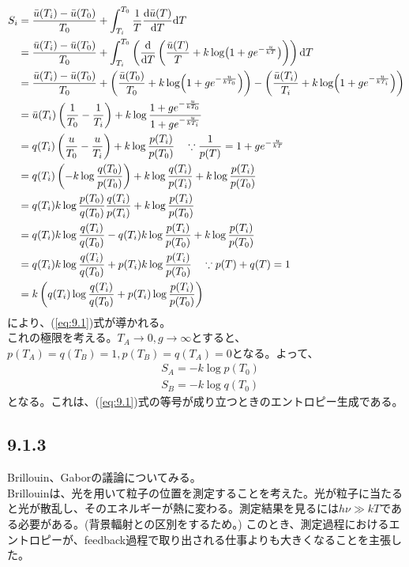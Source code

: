 \documentclass[a4paper,11pt]{jsarticle}
\numberwithin{equation}{section}
\begin{document}
\begin{align}
    S_i &= \frac{\bar{u}(T_i)-\bar{u}(T_0)}{T_0} + \int_{T_i}^{T_0}\frac{1}{T}\frac{\dd \bar{u}(T)}{\dd T}\dd T \\
    &= \frac{\bar{u}(T_i)-\bar{u}(T_0)}{T_0} + \int_{T_i}^{T_0}\left(\dv{T} \left(\frac{\bar{u}(T)}{T} +k\log(1+ge^{-\frac{u}{kT}})\right)\right)\dd T \\
    &= \frac{\bar{u}(T_i)-\bar{u}(T_0)}{T_0} + \left(\frac{\bar{u}(T_0)}{T_0} +k\log(1+ge^{-\frac{u}{kT_0}})\right) - \left(\frac{\bar{u}(T_i)}{T_i} +k\log(1+ge^{-\frac{u}{kT_i}})\right) \\
    &= \bar{u}(T_i)\left(\frac{1}{T_0} - \frac{1}{T_i}\right) + k\log\frac{1+ge^{-\frac{u}{kT_0}}}{1+ge^{-\frac{u}{kT_i}}} \\
    &= q(T_i)\left(\frac{u}{T_0} - \frac{u}{T_i}\right) + k\log\frac{p(T_i)}{p(T_0)} \quad \because \frac{1}{p(T)} = 1+ge^{-\frac{u}{kT}}\\
    &= q(T_i)\left(-k\log\frac{q(T_0)}{p(T_0)}\right) + k\log\frac{q(T_i)}{p(T_i)} + k\log\frac{p(T_i)}{p(T_0)} \\
    &= q(T_i)k\log\frac{p(T_0)}{q(T_0)}\frac{q(T_i)}{p(T_i)} + k\log\frac{p(T_i)}{p(T_0)} \\
    &= q(T_i)k\log\frac{q(T_i)}{q(T_0)} - q(T_i)k\log\frac{p(T_i)}{p(T_0)} + k\log\frac{p(T_i)}{p(T_0)} \\
    &= q(T_i)k\log\frac{q(T_i)}{q(T_0)} + p(T_i)k\log\frac{p(T_i)}{p(T_0)} \quad \because p(T) + q(T) = 1\\
    &= k\left(q(T_i)\log\frac{q(T_i)}{q(T_0)} + p(T_i)\log\frac{p(T_i)}{p(T_0)}\right)
\end{align}
により、(\ref{eq:9.1})式が導かれる。\hfill\qedsymbol\\

これの極限を考える。$T_A \to 0,g \to \infty$とすると、$p(T_A) = q(T_B) = 1, p(T_B) = q(T_A) = 0$となる。よって、
\begin{align}
    & S_A = -k\log p(T_0) \\
    & S_B = -k\log q(T_0)
\end{align}
となる。これは、(\ref{eq:9.1})式の等号が成り立つときのエントロピー生成である。\\

\subsection*{9.1.3}
Brillouin、Gaborの議論についてみる。\\
Brillouinは、光を用いて粒子の位置を測定することを考えた。光が粒子に当たると光が散乱し、そのエネルギーが熱に変わる。測定結果を見るには$h\nu \gg kT$である必要がある。(背景輻射との区別をするため。)
このとき、測定過程におけるエントロピーが、feedback過程で取り出される仕事よりも大きくなることを主張した。\\
\end{document}
